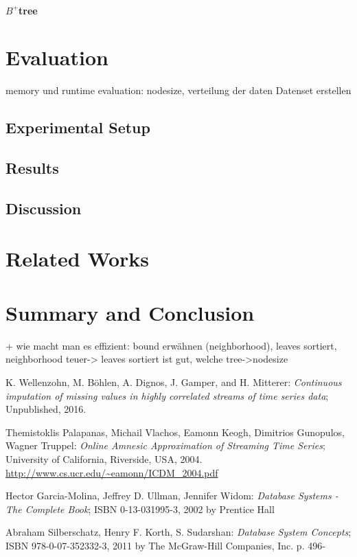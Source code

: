 \documentclass[abstracton,12pt]{scrreprt}
\begin{document}
\subsubsection{$B^+$tree}

\chapter{Evaluation}
\label{sec:Experimental}
memory und runtime evaluation: 
nodesize, verteilung der daten 
Datenset erstellen 


\section{Experimental Setup}
\section{Results}
\section{Discussion}


\chapter{Related Works}


\chapter{Summary and Conclusion}
\label{sec:Summary}

+ wie macht man es effizient: bound erwähnen (neighborhood), leaves sortiert, neighborhood teuer-> leaves sortiert ist gut, 
welche tree->nodesize


\begin{thebibliography}{99}
	
	
	 K. Wellenzohn, M. Böhlen, A. Dignos, J. Gamper, and H. Mitterer: \emph{Continuous imputation of missing values in highly correlated streams of time series data}; Unpublished, 2016.
	
	 Themistoklis Palapanas, Michail Vlachos, Eamonn Keogh, Dimitrios Gunopulos, Wagner Truppel: \emph{Online Amnesic Approximation of Streaming Time Series}; University of California, Riverside, USA, 2004. \url{http://www.cs.ucr.edu/~eamonn/ICDM_2004.pdf}

	 Hector Garcia-Molina, Jeffrey D. Ullman, Jennifer Widom: \emph{Database Systems - The Complete Book}; ISBN 0-13-031995-3, 2002 by Prentice Hall
		
	 Abraham Silberschatz, Henry F. Korth, S. Sudarshan: \emph{Database System Concepts}; ISBN 978-0-07-352332-3, 2011 by The McGraw-Hill Companies, Inc. p. 496-



\end{thebibliography}
\end{document}
